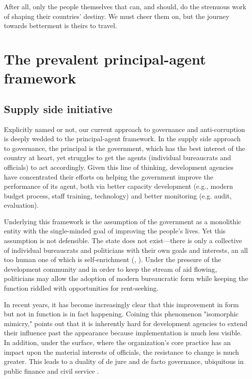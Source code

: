 \documentclass[12pt]{article}
\begin{document}
After all, only the people themselves that can, and should, do the strenuous work of shaping their countries' destiny. We must cheer them on, but the journey towards betterment is theirs to travel.

\section{The prevalent principal-agent framework} \label{sec:principalagent}

\subsection{Supply side initiative} \label{sec:supplyside}
Explicitly named or not, our current approach to governance and anti-corruption is deeply wedded to the principal-agent framework. In the supply side approach to governance, the principal is the government, which has the best interest of the country at heart, yet struggles to get the agents (individual bureaucrats and officials) to act accordingly. Given this line of thinking, development agencies have concentrated their efforts on helping the government improve the performance of its agent, both via better capacity development (e.g., modern budget process, staff training, technology) and better monitoring  (e.g. audit, evaluation).

Underlying this framework is the assumption of the government as a monolithic entity with the single-minded goal of improving the people's lives. Yet this assumption is not defensible. The state does not exist---there is only a collective of individual bureaucrats and politicians with their own goals and interests, an all too human one of which is self-enrichment (\citealp{Booth2012}, \citealp{Shleifer2002}). Under the pressure of the development community and in order to keep the stream of aid flowing, politicians may allow the adoption of modern bureaucratic form while keeping the function riddled with opportunities for rent-seeking.

In recent years, it has become increasingly clear that this improvement in form but not in function is in fact happening.  Coining this phenomenon "isomorphic mimicry," \citet{Andrews2010} points out that it is inherently hard for development agencies to extend their influence past the appearance because implementation is much less visible. In addition, under the surface, where the organization's core practice has an impact upon the material interests of officials, the resistance to change is much greater. This leads to a duality of de jure and de facto governance, ubiquitous in public finance and civil service \citep[8-9]{Andrews2009}.
\end{document}
